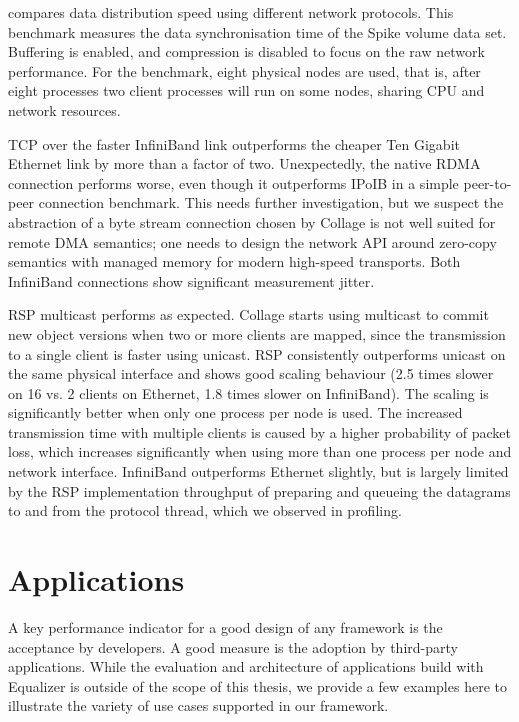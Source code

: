  compares data distribution speed using different network
protocols. This benchmark measures the data synchronisation time of the Spike volume
data set. Buffering is enabled, and compression is disabled to
focus on the raw network performance. For the benchmark, eight physical nodes
are used, that is, after eight processes two client processes will run on some
nodes, sharing CPU and network resources.

TCP over the faster InfiniBand link outperforms the cheaper Ten Gigabit
Ethernet link by more than a factor of two. Unexpectedly, the native RDMA
connection performs worse, even though it outperforms IPoIB in a simple
peer-to-peer connection benchmark. This needs further investigation, but we
suspect the abstraction of a byte stream connection chosen by Collage is not
well suited for remote DMA semantics; one needs to design the network
API around zero-copy semantics with managed memory for modern high-speed
transports. Both InfiniBand connections show significant measurement jitter.

RSP multicast performs as expected. Collage starts using multicast to commit
new object versions when two or more clients are mapped, since the transmission
to a single client is faster using unicast. RSP consistently outperforms
unicast on the same physical interface and shows good scaling behaviour (2.5
times slower on 16 vs. 2 clients on Ethernet, 1.8 times slower on InfiniBand).
The scaling is significantly better when only one process per node is used. The
increased transmission time with multiple clients is caused by a higher
probability of packet loss, which increases significantly when using more than
one process per node and network interface. InfiniBand outperforms Ethernet
slightly, but is largely limited by the RSP implementation throughput of
preparing and queueing the datagrams to and from the protocol thread, which we
observed in profiling.


\chapter{Applications}\label{sApplications}

A key performance indicator for a good design of any framework is the
acceptance by developers. A good measure is the adoption by third-party
applications. While the evaluation and architecture of applications build with
Equalizer is outside of the scope of this thesis, we provide a few examples
here to illustrate the variety of use cases supported in our framework.

